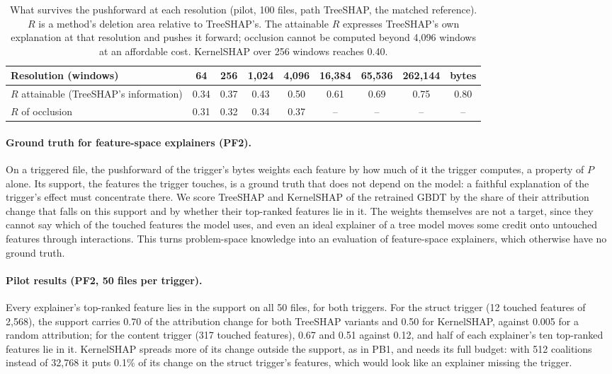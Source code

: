 \begin{table}[t]
  \centering
  \small
  \begin{tabular}{lcccccccc}
    \toprule
    Resolution (windows) & 64 & 256 & 1{,}024 & 4{,}096 & 16{,}384 & 65{,}536 & 262{,}144 & bytes \\
    \midrule
    $R$ attainable (TreeSHAP's information) & 0.34 & 0.37 & 0.43 & 0.50 & 0.61 & 0.69 & 0.75 & 0.80 \\
    $R$ of occlusion & 0.31 & 0.32 & 0.34 & 0.37 & -- & -- & -- & -- \\
    \bottomrule
  \end{tabular}
  \caption{What survives the pushforward at each resolution (pilot, 100 files, path TreeSHAP, the matched reference). $R$ is a method's deletion area relative to TreeSHAP's. The attainable $R$ expresses TreeSHAP's own explanation at that resolution and pushes it forward; occlusion cannot be computed beyond 4{,}096 windows at an affordable cost. KernelSHAP over 256 windows reaches 0.40.}
  \label{tab:XML:Resolution}
\end{table}

\paragraph{Ground truth for feature-space explainers (PF2).} On a triggered file, the pushforward of the trigger's bytes weights each feature by how much of it the trigger computes, a property of $P$ alone. Its support, the features the trigger touches, is a ground truth that does not depend on the model: a faithful explanation of the trigger's effect must concentrate there. We score TreeSHAP and KernelSHAP of the retrained GBDT by the share of their attribution change that falls on this support and by whether their top-ranked features lie in it. The weights themselves are not a target, since they cannot say which of the touched features the model uses, and even an ideal explainer of a tree model moves some credit onto untouched features through interactions. This turns problem-space knowledge into an evaluation of feature-space explainers, which otherwise have no ground truth.

\paragraph{Pilot results (PF2, 50 files per trigger).} Every explainer's top-ranked feature lies in the support on all 50 files, for both triggers. For the struct trigger (12 touched features of 2{,}568), the support carries 0.70 of the attribution change for both TreeSHAP variants and 0.50 for KernelSHAP, against 0.005 for a random attribution; for the content trigger (317 touched features), 0.67 and 0.51 against 0.12, and half of each explainer's ten top-ranked features lie in it. KernelSHAP spreads more of its change outside the support, as in PB1, and needs its full budget: with 512 coalitions instead of 32{,}768 it puts 0.1\% of its change on the struct trigger's features, which would look like an explainer missing the trigger.

